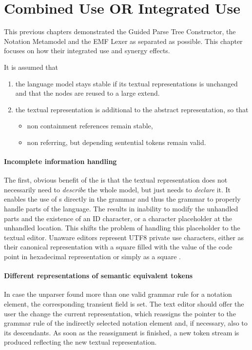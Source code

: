 \section{Combined Use OR Integrated Use}

This previous chapters  demonstrated the Guided Parse Tree Constructor, the Notation Metamodel and the EMF Lexer as separated as possible. This chapter focuses on how their integrated use and synergy effects. 

It is assumed that 
\begin{enumerate}
	\item the language model stays stable if its textual representations is unchanged and that the nodes are reused to a large extend.
	\item the textual representation is additional to the abstract representation, so that 
	\begin{itemize}
		\item non containment references remain stable,
		\item non  referring, but  depending sentential tokens remain valid.
	\end{itemize}
\end{enumerate}


\paragraph{Incomplete information handling}
The first, obvious benefit of the  is that the textual representation does not necessarily need to \emph{describe} the whole model, but just needs to \emph{declare} it. It enables the use of s directly in the grammar and thus the grammar to properly handle parts of the language. The results in inability to modify the unhandled parts and the existence of an ID character, or a character placeholder at the unhandled location. This shifts the problem of handling this placeholder to the textual editor. Unaware editors represent UTF8 private use characters, either as their canonical representation with a square filled with the value of the code point in hexadecimal representation or simply as a square \code{$\square$}.

\paragraph{Different representations of semantic equivalent tokens}
In case the unparser found more than one valid grammar rule for a notation element, the corresponding transient field is set. The text editor should offer the user the change the current representation, which reassigns the pointer to the grammar rule of the indirectly selected notation element and, if necessary, also to its descendants. As soon as the reassignment is finished, a new token stream is produced reflecting the new textual representation.

